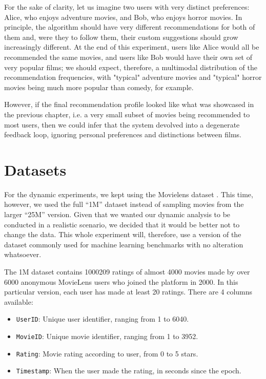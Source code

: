 For the sake of clarity, let us imagine two users with very distinct
preferences: Alice, who enjoys adventure movies, and Bob, who enjoys horror
movies. In principle, the algorithm should have very different recommendations
for both of them and, were they to follow them, their custom suggestions should
grow increasingly different. At the end of this experiment, users like Alice
would all be recommended the same movies, and users like Bob would have their
own set of very popular films; we should expect, therefore, a multimodal
distribution of the recommendation frequencies, with "typical" adventure movies
and "typical" horror movies being much more popular than comedy, for example.

However, if the final recommendation profile looked like what was showcased in
the previous chapter, i.e. a very small subset of movies being recommended to
most users, then we could infer that the system devolved into a degenerate
feedback loop, ignoring personal preferences and distinctions between films.

\section{Datasets}
\label{sec:datasets04}

For the dynamic experiments, we kept using the Movielens dataset
\citep{harper_movielens_2015}. This time, however, we used the full ``1M''
dataset instead of sampling movies from the larger ``25M'' version. Given that
we wanted our dynamic analysis to be conducted in a realistic scenario, we
decided that it would be better not to change the data. This whole experiment
will, therefore, use a version of the dataset commonly used for machine learning
benchmarks with no alteration whatsoever.

The 1M dataset contains 1000209 ratings of almost 4000 movies made by over 6000
anonymous MovieLens users who joined the platform in 2000. In this particular
version, each user has made at least 20 ratings. There are 4 columns available:

\begin{itemize}
  \item \verb|UserID|: Unique user identifier, ranging from 1 to 6040.
  \item \verb|MovieID|: Unique movie identifier, ranging from 1 to 3952.
  \item \verb|Rating|: Movie rating according to user, from 0 to 5 stars.
  \item \verb|Timestamp|: When the user made the rating, in seconds since the
  epoch.
\end{itemize}


